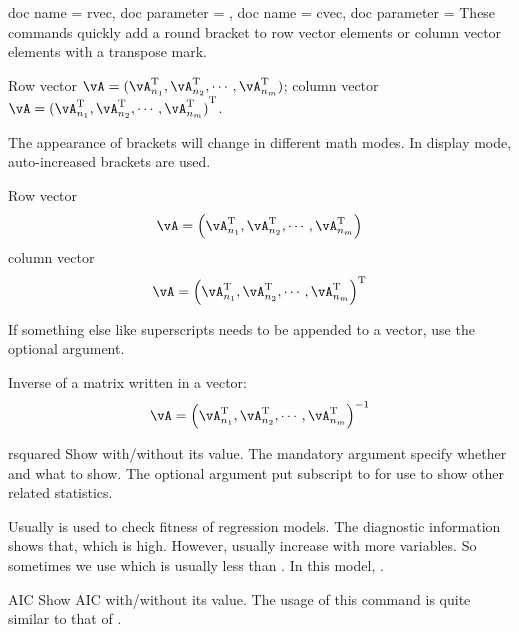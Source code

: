 \documentclass{article}
\begin{document}
\begin{docCommands}{
    {doc name = rvec, doc parameter = },
    {doc name = cvec, doc parameter = }
}
These commands quickly add a round bracket to row vector elements or column vector elements with a transpose mark.
\begin{dispExample}
Row vector $\vA = \rvec{\vA_{n_1}\T,\vA_{n_2}\T,\cdots,\vA_{n_m}\T}$;
column vector $\vA = \cvec{\vA_{n_1}\T,\vA_{n_2}\T,\cdots,\vA_{n_m}\T}$.
\end{dispExample}
The appearance of brackets will change in different math modes. 
In display mode, auto-increased brackets are used.
\begin{dispExample}
Row vector 
$$\vA = \rvec{\vA_{n_1}\T,\vA_{n_2}\T,\cdots,\vA_{n_m}\T}$$
column vector 
$$\vA = \cvec{\vA_{n_1}\T,\vA_{n_2}\T,\cdots,\vA_{n_m}\T}$$
\end{dispExample}
If something else like superscripts needs to be appended to a vector, use the optional argument.
\begin{dispExample}
Inverse of a matrix written in a vector: 
$$\vA = \rvec{\vA_{n_1}\T,\vA_{n_2}\T,\cdots,\vA_{n_m}\T}[\I]$$
\end{dispExample}
\end{docCommands}

\begin{docCommand}{rsquared}{}
Show \rsquared{} with/without its value. The mandatory argument  specify whether and what to show. The optional argument  put subscript to \rsquared for use to show other related statistics.
\begin{dispExample}
Usually \rsquared{} is used to check fitness of regression models.
The diagnostic information shows that,  which is high.
However, \rsquared{} usually increase with more variables.
So sometimes we use \rsquared[adj]{} which is usually less than \rsquared{}. 
In this model, .
\end{dispExample}
\end{docCommand}

\begin{docCommand}{AIC}{}
    Show AIC with/without its value. The usage of this command is quite similar to that of .
\end{docCommand}
\end{document}
